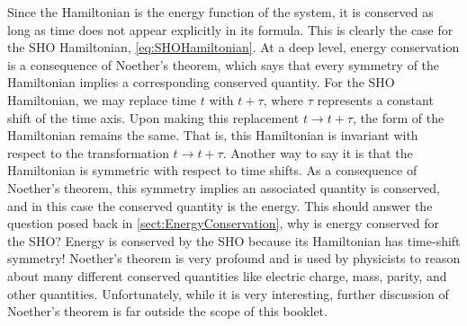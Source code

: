 \documentclass[hidelinks,notitlepage]{book}
\begin{document}
Since the Hamiltonian is the energy function of the system, it is conserved as long as time does not appear explicitly in its formula.  This is clearly the case for the SHO Hamiltonian, \cref{eq:SHOHamiltonian}.  At a deep level, energy conservation is a consequence of Noether's theorem, which says that every symmetry of the Hamiltonian implies a corresponding conserved quantity.  For the SHO Hamiltonian, we may replace time $t$ with $t + \tau$, where $\tau$ represents a constant shift of the time axis.  Upon making this replacement  $t \rightarrow t + \tau$, the form of the Hamiltonian remains the same.  That is, this Hamiltonian is invariant with respect to the transformation $t \rightarrow t + \tau$.  Another way to say it is that the Hamiltonian is symmetric with respect to time shifts.  As a consequence of Noether's theorem, this symmetry implies an associated quantity is conserved, and in this case the conserved quantity is the energy.  This should answer the question posed back in \cref{sect:EnergyConservation}, why is energy conserved for the SHO?  Energy is conserved by the SHO because its Hamiltonian has time-shift symmetry!  Noether's theorem is very profound and is used by physicists to reason about many different conserved quantities like electric charge, mass, parity, and other quantities.  Unfortunately, while it is very interesting, further discussion of Noether's theorem is far outside the scope of this booklet.
\end{document}
